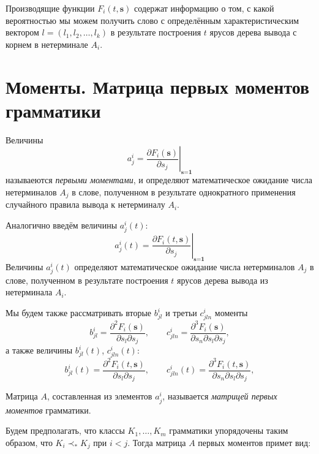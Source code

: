 \documentclass[12pt]{article}
\begin{document}
\hrulefill

\begin{footnotesize}
Производящие функции $F_i(t, \textbf{s})$ содержат информацию о том, с какой вероятностью мы можем получить слово с определённым характеристическим вектором $l = (l_1, l_2, \ldots, l_k)$ в результате построения $t$ ярусов дерева вывода с корнем в нетерминале $A_i$.
\end{footnotesize}

\hrulefill

\section{Моменты. Матрица первых моментов грамматики}

Величины
\begin{equation}
	a^i_j = \left.\frac{\partial F_i(\textbf{s})}{\partial s_j}\right|_{\textbf{s} = \textbf{1}}
\end{equation}
называеются \textit{первыми моментами}, и определяют математическое ожидание числа нетерминалов $A_j$ в слове, полученном в результате однократного применения случайного правила вывода к нетерминалу $A_i$.

Аналогично введём величины $a^i_j(t)$:
\begin{equation}
	a^i_j(t) = \left.\frac{\partial F_i(t, \textbf{s})}{\partial s_j}\right|_{\textbf{s} = \textbf{1}}
\end{equation}
Величины $a^i_j(t)$ определяют математическое ожидание числа нетерминалов $A_j$ в слове, полученном в результате построения $t$ ярусов дерева вывода из нетерминала $A_i$.

Мы будем также рассматривать вторые $b^i_{jl}$ и третьи $c^i_{jln}$ моменты
\begin{equation}
	b^i_{jl} = \frac{\partial^2 F_i(\textbf{s})}{\partial s_l \partial s_j},\qquad c^i_{jln} = \frac{\partial^3 F_i(\textbf{s})}{\partial s_n \partial s_l \partial s_j},
\end{equation}
а также величины $b^i_{jl}(t)$, $c^i_{jln}(t)$:
\begin{equation}
	b^i_{jl}(t) = \frac{\partial^2 F_i(t, \textbf{s})}{\partial s_l \partial s_j},\qquad c^i_{jln}(t) = \frac{\partial^3 F_i(t, \textbf{s})}{\partial s_n \partial s_l \partial s_j},
\end{equation}

Матрица $A$, составленная из элементов $a^i_j$, называется \textit{матрицей первых моментов} грамматики.

Будем предполагать, что классы $K_1, \ldots, K_m$ грамматики упорядочены таким образом, что $K_i \prec_* K_j$ при $i < j$. Тогда матрица $A$ первых моментов примет вид:
\end{document}
